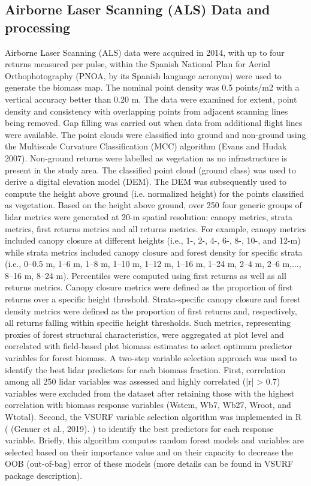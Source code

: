 \subsection{Airborne Laser Scanning (ALS) Data and processing}\label{sec:carbon:mat-lidar}

Airborne Laser Scanning (ALS) data were acquired in 2014, with up to four returns measured per pulse, within the Spanish National Plan for Aerial Orthophotography (PNOA, by its Spanish language acronym) were used to generate the biomass map. The nominal point density was 0.5 points/m2 with a vertical accuracy better than 0.20 m. 
The data were examined for extent, point density and consistency with overlapping points from adjacent scanning lines being removed. Gap filling was carried out when data from additional flight lines were available. The point clouds were classified into ground and non-ground using the Multiscale Curvature Classification (MCC) algorithm (Evans and Hudak 2007). Non-ground returns were labelled as vegetation as no infrastructure is present in the study area. The classified point cloud (ground class) was used to derive a digital elevation model (DEM). The DEM was subsequently used to compute the height above ground (i.e. normalized height) for the points classified as vegetation. Based on the height above ground, over 250 four generic groups of lidar metrics were generated at 20-m spatial resolution: canopy metrics, strata metrics, first returns metrics and all returns metrics. For example, canopy metrics included canopy closure at different heights (i.e., 1-, 2-, 4-, 6-, 8-, 10-, and 12-m) while strata metrics included canopy closure and forest density for specific strata (i.e., 0–0.5 m, 1–6 m, 1–8 m, 1–10 m, 1–12 m, 1–16 m, 1–24 m, 2–4 m, 2–6 m,..., 8–16 m, 8–24 m). Percentiles were computed using first returns as well as all returns metrics. Canopy closure metrics were defined as the proportion of first returns over a specific height threshold. Strata-specific canopy closure and forest density metrics were defined as the proportion of first returns and, respectively, all returns falling within specific height thresholds. Such metrics, representing proxies of forest structural characteristics, were aggregated at plot level and correlated with field-based plot biomass estimates to select optimum predictor variables for forest biomass.
A two-step variable selection approach was used to identify the best lidar predictors for each biomass fraction.  First, correlation among all 250 lidar variables was assessed and highly correlated (|r| > 0.7) variables were excluded from the dataset after retaining those with the highest correlation with biomass response variables (Wstem, Wb7, Wb27, Wroot, and Wtotal).  Second, the VSURF variable selection algorithm was implemented in R ( (Genuer et al., 2019). ) to identify the best predictors for each response variable. Briefly, this algorithm computes random forest models and variables are selected based on their importance value and on their capacity to decrease the OOB (out-of-bag) error of these models (more details can be found in VSURF package description). 


